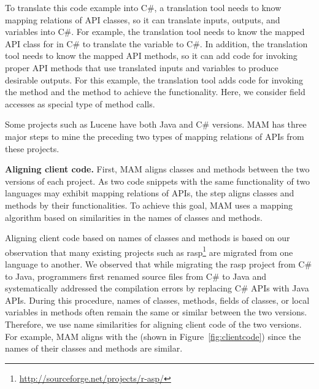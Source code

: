 To translate this code example into C\#, a translation tool needs to
know mapping relations of API classes, so it can translate inputs,
outputs, and variables into C\#. For example, the translation tool
needs to know the mapped API class for  in C\#
to translate the variable  to C\#. In addition, the
translation tool needs to know the mapped API methods, so it can
add code for invoking proper API methods that use translated inputs and variables to
produce desirable outputs. For this example, the translation tool
adds code for invoking the  method and the
 method to achieve the functionality.
Here, we consider field accesses as special type of method calls.

Some projects such as Lucene have both Java and C\# versions. MAM
has three major steps to mine the preceding two types of mapping
relations of APIs from these projects.

\textbf{Aligning client code.} First, MAM aligns classes and methods
between the two versions of each project. As two code snippets with
the same functionality of two languages may exhibit mapping
relations of APIs, the step aligns classes and methods by their
functionalities. To achieve this goal, MAM uses a mapping algorithm
based on similarities in the names of classes and methods.

Aligning client code based on names of classes and methods is based
on our observation that many existing projects such as
rasp\footnote{\url{http://sourceforge.net/projects/r-asp/}} are
migrated from one language to another. We observed that while
migrating the rasp project from C\# to Java, programmers first
renamed source files from C\# to Java and systematically addressed
the compilation errors by replacing C\# APIs with Java APIs. During
this procedure, names of classes, methods, fields of classes, or
local variables in methods often remain the same or similar between
the two versions. Therefore, we use name similarities for aligning
client code of the two versions. For example, MAM aligns
 with the  (shown in
Figure~\ref{fig:clientcode}) since the names of their classes and
methods are similar.

